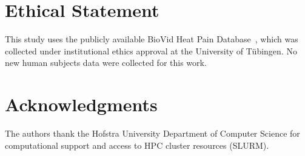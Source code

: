 \documentclass[sigconf]{acmart}
\begin{document}
\section*{Ethical Statement}

This study uses the publicly available BioVid Heat Pain Database~\cite{walter2013},
which was collected under institutional ethics approval at the University of
T\"{u}bingen. No new human subjects data were collected for this work.

\section*{Acknowledgments}

The authors thank the Hofstra University Department of Computer Science for
computational support and access to HPC cluster resources (SLURM).



\end{document}
